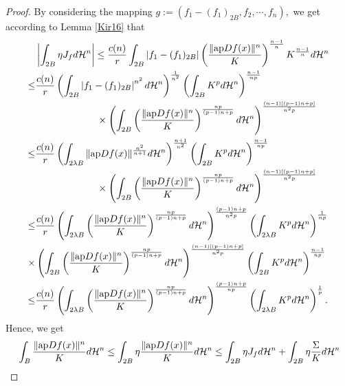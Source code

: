\documentclass[11pt,twoside]{article}
\theoremstyle{definition}
\theoremstyle{remark}
\newcommand{\abs}[1]{\left|#1\right|}
\begin{document}
\begin{proof}
By considering the mapping $g:=(f_{1}-(f_{1})_{2B},f_{2},\cdots,f_{n}),$ we get according to Lemma \ref{Kir16} that 
\begin{equation}\label{e2wegystjst}
\begin{aligned}
&\abs{ \int_{2B }\eta J_{f}d\mathcal{H}^{n}}\leq \frac{c(n)}{r}\int_{ 2B}\abs{f_{1}-(f_{1})_{2B}}\left(\frac{\| {\rm ap}Df(x)\|^{n}}{K}\right)^{\frac{n-1}{n}}K^{\frac{n-1}{n}}d\mathcal{H}^{n}\\
\leq&\frac{c(n)}{r} \left(\int_{ 2B}\abs{f_{1}-(f_{1})_{2B}}^{n^{2}}d\mathcal{H}^{n}\right)^{\frac{1}{n^{2}}}\left(\int_{ 2B}K^{p}d\mathcal{H}^{n}\right)^{\frac{n-1}{np}}
\\
&\;\;\;\;\;\;\;\;\;\;\;\;\;\;\;\;\;\;\;\;\;\;\;\times\left(\int_{ 2B}\left(\frac{\| {\rm ap}Df(x)\|^{n}}{K}\right)^{\frac{np}{(p-1)n+p}}d\mathcal{H}^{n}\right)^{\frac{(n-1)[(p-1)n+p]}{n^{2}p}}\\
\leq& \frac{c(n)}{r}\left(\int_{ 2\lambda B}\| {\rm ap}Df(x)\|^{\frac{n^{2}}{n+1}}d\mathcal{H}^{n}\right)^{\frac{n+1}{n^{2}}}\left(\int_{ 2B}K^{p}d\mathcal{H}^{n}\right)^{\frac{n-1}{np}}
\\
&\;\;\;\;\;\;\;\;\;\;\;\;\;\;\;\;\;\;\;\;\;\;\;\times\left(\int_{ 2B}\left(\frac{\| {\rm ap}Df(x)\|^{n}}{K}\right)^{\frac{np}{(p-1)n+p}}d\mathcal{H}^{n}\right)^{\frac{(n-1)[(p-1)n+p]}{n^{2}p}}\\
\leq& \frac{c(n)}{r}\left(\int_{ 2\lambda B}\left(\frac{\| {\rm ap}Df(x)\|^{n}}{K}\right)^{\frac{np}{(p-1)n+p}}d\mathcal{H}^{n}\right)^{\frac{(p-1)n+p}{n^{2}p}}\left(\int_{ 2\lambda B}K^{p}d\mathcal{H}^{n}\right)^{\frac{1}{np}}
\\
\times&\left(\int_{ 2B}\left(\frac{\| {\rm ap}Df(x)\|^{n}}{K}\right)^{\frac{np}{(p-1)n+p}}d\mathcal{H}^{n}\right)^{\frac{(n-1)[(p-1)n+p]}{n^{2}p}}\left(\int_{ 2B}K^{p}d\mathcal{H}^{n}\right)^{\frac{n-1}{np}}\\
\leq& \frac{c(n)}{r}\left(\int_{ 2\lambda B}\left(\frac{\| {\rm ap}Df(x)\|^{n}}{K}\right)^{\frac{np}{(p-1)n+p}}d\mathcal{H}^{n}\right)^{\frac{(p-1)n+p}{np}}\left(\int_{ 2\lambda B}K^{p}d\mathcal{H}^{n}\right)^{\frac{1}{p}}.
\end{aligned}
\end{equation}
Hence, we get
\begin{equation}\label{e2wegystjscscdushydicokpl}
\begin{aligned}
&\int_{B}\frac{\| {\rm ap}Df(x)\|^{n}}{K}d\mathcal{H}^{n}\leq\int_{ 2B}\eta\frac{\| {\rm ap}Df(x)\|^{n}}{K}d\mathcal{H}^{n}\leq \int_{2B }\eta J_{f}d\mathcal{H}^{n}+\int_{2B }\eta \frac{\Sigma}{K} d\mathcal{H}^{n}\\

\end{aligned}
\end{equation}
\end{proof}
\end{document}
